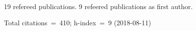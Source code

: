 19 refereed publications. 9 refeered publications as first author.

               Total citations~=~410; h-index~=~9 (2018-08-11)